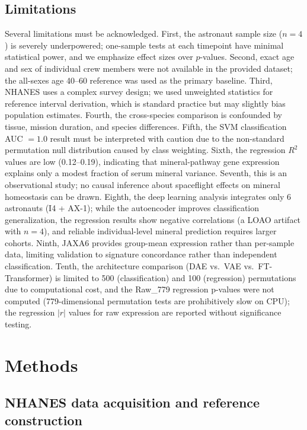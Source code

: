\documentclass[11pt,a4paper]{article}
\begin{document}
\subsection{Limitations}

Several limitations must be acknowledged. First, the astronaut sample size ($n = 4$) is severely underpowered; one-sample tests at each timepoint have minimal statistical power, and we emphasize effect sizes over $p$-values. Second, exact age and sex of individual crew members were not available in the provided dataset; the all-sexes age 40--60 reference was used as the primary baseline. Third, NHANES uses a complex survey design; we used unweighted statistics for reference interval derivation, which is standard practice but may slightly bias population estimates. Fourth, the cross-species comparison is confounded by tissue, mission duration, and species differences. Fifth, the SVM classification AUC $= 1.0$ result must be interpreted with caution due to the non-standard permutation null distribution caused by class weighting. Sixth, the regression $R^2$ values are low (0.12--0.19), indicating that mineral-pathway gene expression explains only a modest fraction of serum mineral variance. Seventh, this is an observational study; no causal inference about spaceflight effects on mineral homeostasis can be drawn. Eighth, the deep learning analysis integrates only 6 astronauts (I4 + AX-1); while the autoencoder improves classification generalization, the regression results show negative correlations (a LOAO artifact with $n = 4$), and reliable individual-level mineral prediction requires larger cohorts. Ninth, JAXA6 provides group-mean expression rather than per-sample data, limiting validation to signature concordance rather than independent classification. Tenth, the architecture comparison (DAE vs.\ VAE vs.\ FT-Transformer) is limited to 500 (classification) and 100 (regression) permutations due to computational cost, and the Raw\_779 regression p-values were not computed (779-dimensional permutation tests are prohibitively slow on CPU); the regression $|r|$ values for raw expression are reported without significance testing.

\section{Methods}

\subsection{NHANES data acquisition and reference construction}
\end{document}
